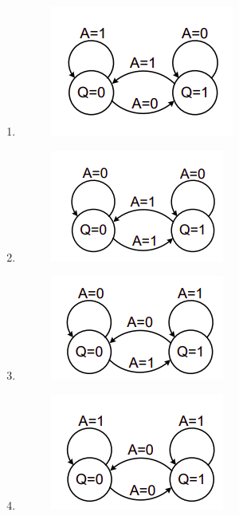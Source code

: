 \documentclass[journal,12pt,onecolumn]{IEEEtran}
\theoremstyle{remark}
\begin{document}
\begin{enumerate}[start=1, label=Q.\arabic*]
\begin{enumerate}
\item 
    \begin{figure}[H]
    \centering
    \includegraphics[width=0.4\columnwidth]{Figures/q30A.png}
    \caption{}
    \end{figure}
    \item 
    \begin{figure}[H]
    \centering
    \includegraphics[width=0.4\columnwidth]{Figures/q30B.png}
    \caption{}
    \end{figure}
    \item 
    \begin{figure}[H]
    \centering
    \includegraphics[width=0.4\columnwidth]{Figures/q30C.png}
    \caption{}
    \end{figure}
    \item 
    \begin{figure}[H]
    \centering
    \includegraphics[width=0.4\columnwidth]{Figures/q30D.png}
    \caption{}
    \end{figure}
\end{enumerate}
\hfill{}


\end{enumerate}
\end{document}
